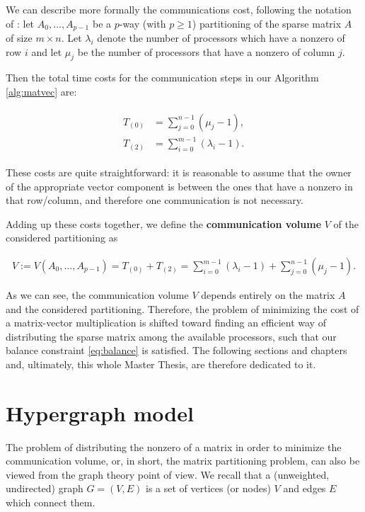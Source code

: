 We can describe more formally the communications cost, following the notation of \cite[Def.~2.1]{mondriaan}: let $A_0,\dots,A_{p-1}$ be a $p$-way (with $p \geq 1$) partitioning of the sparse matrix $A$ of size $m \times n$. Let $\lambda_i$ denote the number of processors which have a nonzero of row $i$ and let $\mu_j$ be the number of processors that have a nonzero of column $j$.

Then the total time costs for the communication steps in our Algorithm \ref{alg:matvec} are:

\begin{align}
	\begin{aligned}
	T_{(0)} &= \sum_{j=0}^{n-1} (\mu_j -1), \\
	T_{(2)} &= \sum_{i=0}^{m-1} (\lambda_i -1).
\end{aligned} \label{eq:T_comm}
\end{align}

These costs are quite straightforward: it is reasonable to assume that the owner of the appropriate vector component is between the ones that have a nonzero in that row/column, and therefore one communication is not necessary.

Adding up these costs together, we define the \textbf{communication volume} $V$ of the considered partitioning as

\begin{align}
	V := V(A_0,\dots,A_{p-1}) = T_{(0)} + T_{(2)} = \sum_{i=0}^{m-1} (\lambda_i -1) + \sum_{j=0}^{n-1} (\mu_j-1).
	\label{eq:volume}
\end{align}

As we can see, the communication volume $V$ depends entirely on the matrix $A$ and the considered partitioning. Therefore, the problem of minimizing the cost of a matrix-vector multiplication is shifted toward finding an efficient way of distributing the sparse matrix among the available processors, such that our balance constraint \eqref{eq:balance} is satisfied. The following sections and chapters and, ultimately, this whole Master Thesis, are therefore dedicated to it.

\section{Hypergraph model}

The problem of distributing the nonzero of a matrix in order to minimize the communication volume, or, in short, the matrix partitioning problem, can also be viewed from the graph theory point of view. We recall that a (unweighted, undirected) graph $G=(V,E)$ is a set of vertices (or nodes) $V$ and edges $E$ which connect them. 

